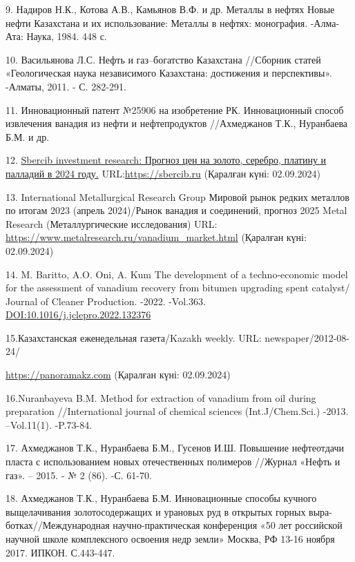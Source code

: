 \begin{references}
9. Надиров Н.К., Котова А.В., Камьянов В.Ф. и др. Металлы в нефтях Новые
нефти Казахстана и их использование: Металлы в нефтях: монография.
-Алма-Ата: Наука, 1984. 448 с.

10. Васильянова Л.С. Нефть и газ--богатство Казахстана //Сборник статей
«Геологическая наука независимого Казахстана: достижения и перспективы».
-Алматы, 2011. - С. 282-291.

11. Инновационный патент №25906 на изобретение РК. Инновационный способ
извлечения ванадия из нефти и нефтепродуктов //Ахмеджанов Т.К.,
Нуранбаева Б.М. и др.

12.
\href{https://sbercib.ru/publications/sbercib-investment-research}{Sbercib
investment research: Прогноз цен на золото, серебро, платину и палладий
в 2024 году.} URL:\href{https://sbercib.ru/publication/prognoz-tsen-na-zoloto-serebro-platinu-i-palladii-v-2024-godu}{https://sbercib.ru}
(Қаралған күні: 02.09.2024)

13. International Metallurgical Research Group Мировой рынок редких
металлов по итогам 2023 (апрель 2024)/Рынок ванадия и соединений,
прогноз 2025 Metal Research (Металлургические исследования) URL:
\url{https://www.metalresearch.ru/vanadium_market.html} (Қаралған күні:
02.09.2024)

14. M. Baritto, A.O. Oni, A. Kum The development of a techno-economic
model for the assessment of vanadium recovery from bitumen upgrading
spent catalyst/ Journal of Cleaner Production. -2022. -Vol.363.
\href{https://doi.org/10.1016/j.jclepro.2022.132376}{DOI:10.1016/j.jclepro.2022.132376}

15.Казахстанская еженедельная газета/Kazakh weekly. URL:
newspaper/2012-08-24/ 

\href{https://panoramakz.com/index.php/economics/oil/item/32263-?utm_source=google.com&utm_medium=organic&utm_campaign=google.com&utm_referrer=google.com}{https://panoramakz.com}
(Қаралған күні: 02.09.2024)

16.Nuranbayeva B.M. Method for extraction of vanadium from oil during
preparation //International journal of chemical sciences
(Int.J/Chem.Sci.) -2013. --Vol.11(1). -P.73-84.

17. Ахмеджанов Т.К., Нуранбаева Б.М., Гусенов И.Ш. Повышение нефтеотдачи
пласта с использованием новых отечественных полимеров //Журнал «Нефть и
газ». -- 2015. - № 2 (86). -С. 61-70.

18. Ахмеджанов Т.К., Нуранбаева Б.М. Инновационные способы кучного
выщелачивания золотосодержащих и урановых руд в открытых горных
выра-ботках//Международная научно-практическая конференция «50 лет
российской научной школе комплексного освоения недр земли» Москва, РФ
13-16 ноября 2017. ИПКОН. С.443-447.


\end{references}
